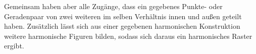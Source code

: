 \documentclass[12pt,a4paper]{article}
\begin{document}
Gemeinsam haben aber alle Zugänge, dass ein gegebenes Punkte- oder Geradenpaar von  zwei weiteren im selben Verhältnis innen und außen geteilt haben. Zusätzlich lässt sich aus einer gegebenen harmonischen Konstruktion weitere harmonische Figuren bilden, sodass sich daraus ein harmonisches Raster ergibt.

\newpage
\listoffigures

\newpage
\nocite{proCG}
\nocite{perspectivesOnProGeo}
\nocite{doppelVerhaeltnis}
\nocite{proGeoGrundlagen}


\end{document}
